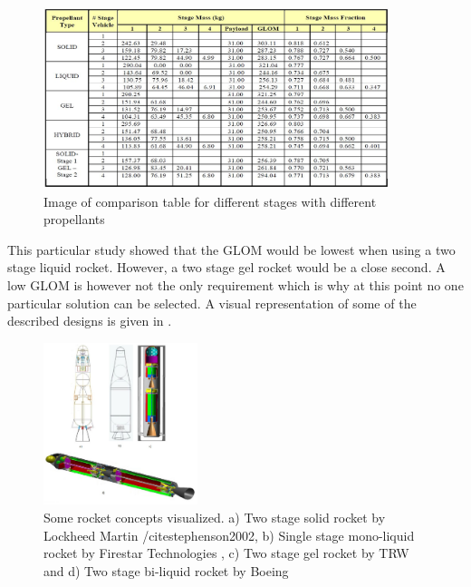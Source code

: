 \begin{figure}[!ht]
\centering
\includegraphics[width=0.9\textwidth]{figures/launcher_methods/examplestaging_trinidad2012.jpg}
\caption{Image of comparison table for different stages with different propellants\cite{trinidad2012}}
\label{fig:examplestaging_trinidad2012}
\end{figure}

This particular study showed that the \ac{GLOM} would be lowest when using a two stage liquid rocket. However,   a two stage gel rocket would be a close second. A low \ac{GLOM} is however not the only requirement which is why at this point no one particular solution can be selected. A visual representation of some of the described designs is given in .


\begin{figure}[!ht]
\centering
\includegraphics[width=0.4\textwidth]{figures/launcher_methods/diff_mav_trinidad2012_stephenson2002_mungas2012.jpg}
\caption{Some rocket concepts visualized. a) Two stage solid rocket by Lockheed Martin /cite{stephenson2002}, b) Single stage mono-liquid rocket by Firestar Technologies \cite{mungas2012}, c) Two stage gel rocket by \ac{TRW} \cite{stephenson2002} and d) Two stage bi-liquid rocket by Boeing \cite{trinidad2012}}
\label{fig:diff_mav_trinidad2012_stephenson2002_mungas2012}
\end{figure}
  


